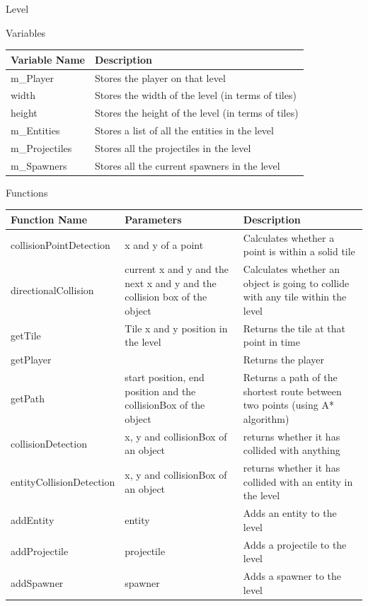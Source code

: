 \documentclass[../../Main.tex]{subfiles}
\begin{document}
    Level
    \begin{center}
        Variables
        \begin{tabular}{ | m{} | m{} | }
            \hline
            \textbf{Variable Name} & \textbf{Description} \\
            \hline
            m\_Player & Stores the player on that level \\
            \hline
            width & Stores the width of the level (in terms of tiles)\\
            \hline
            height & Stores the height of the level (in terms of tiles)\\
            \hline
            m\_Entities & Stores a list of all the entities in the level \\
            \hline
            m\_Projectiles & Stores all the projectiles in the level \\
            \hline
            m\_Spawners & Stores all the current spawners in the level \\
            \hline
        \end{tabular}
        Functions
        \begin{tabular}{ | m{} | m{}| m{} | }
            \hline
            \textbf{Function Name} & \textbf{Parameters} & \textbf{Description} \\
            \hline
            collisionPointDetection & x and y of a point & Calculates whether a point is within a solid tile \\
            \hline
            directionalCollision & current x and y and the next x and y and the collision box of the object & Calculates whether an object is going to collide with any tile within the level \\
            \hline
            getTile & Tile x and y position in the level & Returns the tile at that point in time \\
            \hline
            getPlayer & & Returns the player \\
            \hline
            getPath & start position, end position and the collisionBox of the object & Returns a path of the shortest route between two points (using A* algorithm)\\
            \hline
            collisionDetection & x, y and collisionBox of an object & returns whether it has collided with anything \\
            \hline
            entityCollisionDetection & x, y and collisionBox of an object & returns whether it has collided with an entity in the level \\
            \hline
            addEntity & entity & Adds an entity to the level \\
            \hline
            addProjectile & projectile & Adds a projectile to the level \\
            \hline
            addSpawner & spawner & Adds a spawner to the level \\
            \hline
        \end{tabular}
    \end{center}
\end{document}

